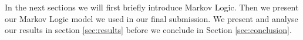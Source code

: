 
In the next sections we will first briefly introduce Markov Logic. Then we present our Markov Logic model we used in our final submission. We present and analyse our results in section \ref{sec:results} before we conclude in Section \ref{sec:conclusion}.



